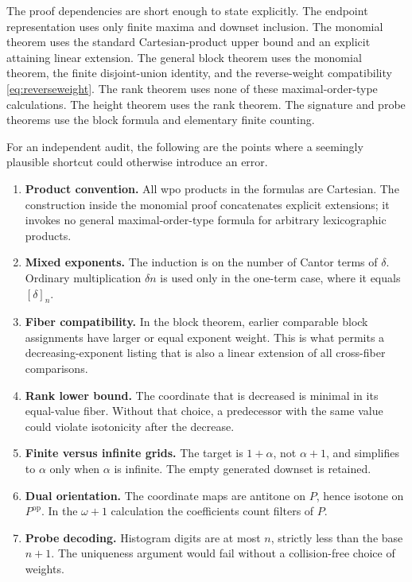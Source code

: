 \documentclass[11pt,a4paper]{article}
\theoremstyle{definition}
\theoremstyle{remark}
\newcommand{\op}{\mathrm{op}}
\newcommand{\Nrep}[2]{\left[#1\right]_{#2}}
\begin{document}
The proof dependencies are short enough to state explicitly. The
endpoint representation uses only finite maxima and downset inclusion.
The monomial theorem uses the standard Cartesian-product upper bound and
an explicit attaining linear extension. The general block theorem uses
the monomial theorem, the finite disjoint-union identity, and the
reverse-weight compatibility \eqref{eq:reverseweight}. The rank theorem
uses none of these maximal-order-type calculations. The height theorem
uses the rank theorem. The signature and probe theorems use the block
formula and elementary finite counting.

For an independent audit, the following are the points where a seemingly
plausible shortcut could otherwise introduce an error.
\begin{enumerate}[leftmargin=2em,itemsep=5pt]
\item \textbf{Product convention.} All wpo products in the formulas are
Cartesian. The construction inside the monomial proof concatenates
explicit extensions; it invokes no general maximal-order-type formula
for arbitrary lexicographic products.
\item \textbf{Mixed exponents.} The induction is on the number of Cantor
terms of $\delta$. Ordinary multiplication $\delta n$ is used only in
the one-term case, where it equals $\Nrep{\delta}{n}$.
\item \textbf{Fiber compatibility.} In the block theorem, earlier
comparable block assignments have larger or equal exponent weight. This
is what permits a decreasing-exponent listing that is also a linear
extension of all cross-fiber comparisons.
\item \textbf{Rank lower bound.} The coordinate that is decreased is
minimal in its equal-value fiber. Without that choice, a predecessor
with the same value could violate isotonicity after the decrease.
\item \textbf{Finite versus infinite grids.} The target is $1+\alpha$,
not $\alpha+1$, and simplifies to $\alpha$ only when $\alpha$ is infinite.
The empty generated downset is retained.
\item \textbf{Dual orientation.} The coordinate maps are antitone on
$P$, hence isotone on $P^{\op}$. In the $\omega+1$ calculation the
coefficients count filters of $P$.
\item \textbf{Probe decoding.} Histogram digits are at most $n$, strictly
less than the base $n+1$. The uniqueness argument would fail without a
collision-free choice of weights.
\end{enumerate}
\end{document}
